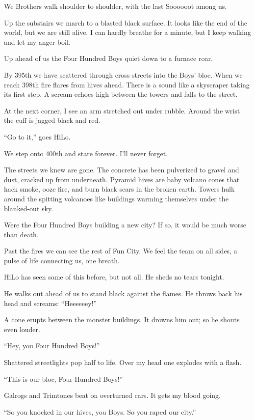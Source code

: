 We Brothers walk shoulder to shoulder, with the last Soooooot among us.

Up the substairs we march to a blasted black surface. It looks like the end of the world, but we are still alive. 
I can hardly breathe for a minute, but I keep walking and let my anger boil.

Up ahead of us the Four Hundred Boys quiet down to a furnace roar.

By 395th we have scattered through cross streets into the Boys' bloc.
When we reach 398th fire flares from hives ahead. There is a sound like a skyscraper taking its first step. A scream echoes high between the towers and falls to the street.

At the next corner, I see an arm stretched out under rubble. Around the wrist the cuff is jagged black and red.

``Go to it,'' goes HiLo.

We step onto 400th and stare forever. I'll never forget.

The streets we knew are gone. The concrete has been pulverized to gravel and dust, cracked up from underneath. Pyramid hives are baby volcano cones that hack smoke, ooze fire, and burn black scars in the broken earth. Towers hulk around the spitting volcanoes like buildings warming themselves under the blanked-out sky.

Were the Four Hundred Boys building a new city? If so, it would be much worse than death.

Past the fires we can see the rest of Fun City. We feel the team on all sides, a pulse of life connecting us, one breath.

HiLo has seen some of this before, but not all. He sheds no tears tonight.

He walks out ahead of us to stand black against the flames. He throws back his head and screams: ``Heeeeeey!''

A cone erupts between the monster buildings. It drowns him out; so he shouts even louder.

``Hey, you Four Hundred Boys!''

Shattered streetlights pop half to life. Over my head one explodes with a flash.

``This is our bloc, Four Hundred Boys!''

Galrogs and Trimtones beat on overturned cars. It gets my blood going.

``So you knocked in our hives, you Boys. So you raped our city.''

